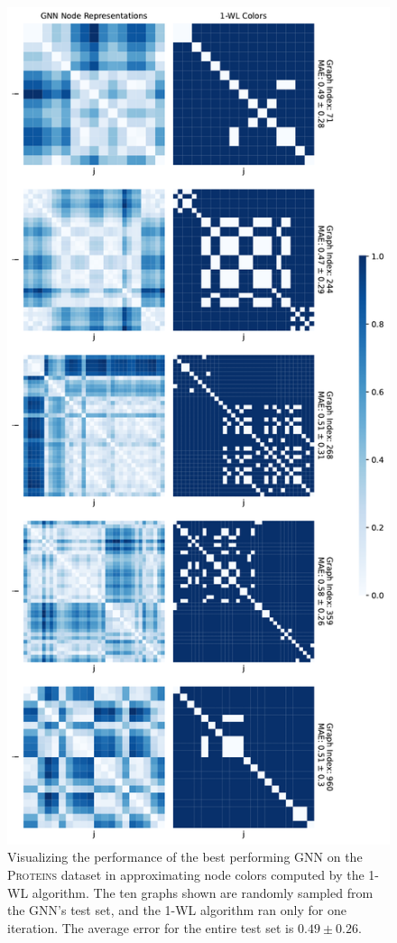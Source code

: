 \begin{figure}[!ht]
\begin{minipage}[b]{0.45992852703\textwidth}
    \end{minipage}
    \hfill
    \begin{minipage}[b]{0.53007147296\textwidth}
        \includegraphics[width=\textwidth, right]{Figures/heatmaps_PROTEINS_1.pdf}
    \end{minipage}
    \hfill
    \caption{Visualizing the performance of the best performing GNN on the \textsc{Proteins} dataset in approximating node colors computed by the 1-WL algorithm. The ten graphs shown are randomly sampled from the GNN's test set, and the 1-WL algorithm ran only for one iteration. The average error for the entire test set is $0.49 \pm 0.26$.}
\end{figure}


    